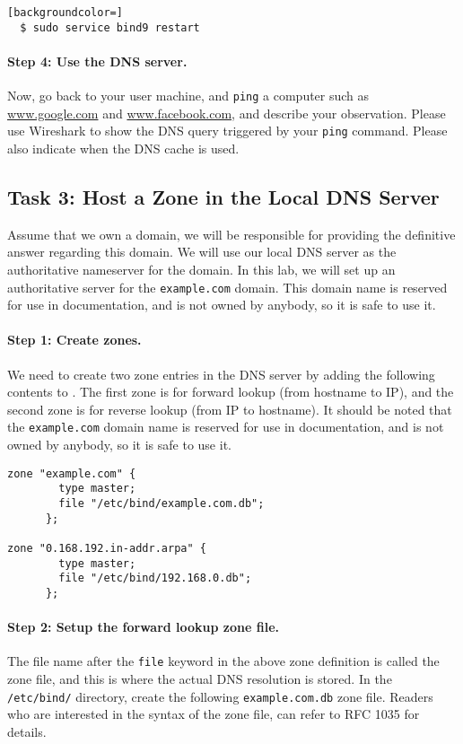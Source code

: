 \begin{lstlisting}[backgroundcolor=]
  $ sudo service bind9 restart
\end{lstlisting}


\paragraph{Step 4: Use the DNS server.}
Now, go back to your user machine, and \texttt{ping} a computer such as 
\url{www.google.com} and \url{www.facebook.com}, and describe your
observation. Please use Wireshark to show the DNS query 
triggered by your \texttt{ping} command. Please also indicate when the DNS
cache is used. 



\subsection{Task 3: Host a Zone in the Local DNS Server}

Assume that we own a domain, 
we will be responsible for providing the
definitive answer regarding this domain.
We will use our local DNS server as the authoritative nameserver for
the domain. In this lab, we will set up an authoritative server
for the \texttt{example.com} domain. 
This domain name is reserved for use in documentation, and is not owned
by anybody, so it is safe to use it.

\paragraph{Step 1: Create zones.}
We need to create two zone entries
in the DNS server by adding the following contents to
.
The first zone is for forward lookup (from hostname to IP),
and the second zone is for reverse lookup (from IP to hostname).
It should be noted that the \texttt{example.com}
domain name is reserved for use in documentation, and is not owned
by anybody, so it is safe to use it.


\begin{lstlisting}
zone "example.com" {
        type master;
        file "/etc/bind/example.com.db";
      };

zone "0.168.192.in-addr.arpa" {
        type master;
        file "/etc/bind/192.168.0.db";
      };
\end{lstlisting}


\paragraph{Step 2: Setup the forward lookup zone file.}
The file name after the {\tt file} keyword in the above zone definition is called
the zone file, and this is where the actual DNS resolution is stored.
In the \texttt{/etc/bind/} directory, create the following
\texttt{example.com.db}
zone file. Readers who are interested in the syntax of the zone file,
can refer to RFC 1035 for details.

